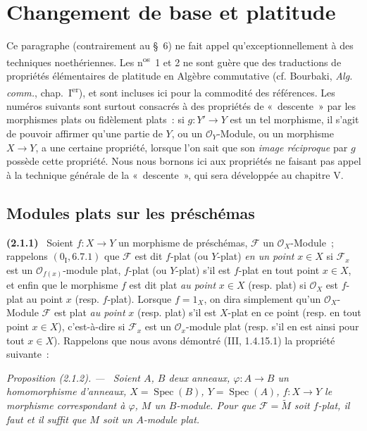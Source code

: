 \documentclass[10pt,oneside]{book}
\makeatletter
\newenvironment{env}[1][]{\par\medskip\noindent\textbf{(#1)}\ }{\par}
\newenvironment{proposition}[1][]{%
  \par\medskip\noindent\itshape Proposition (#1). ---\ }{\par}
\newcommand{\EGAReaderTarget}[2]{\hypertarget{#1}{}\@bsphack\begingroup\def\@currentHref{#1}\label{#2}\endgroup\@esphack}
\makeatother
\begin{document}
\setcounter{section}{1}
\section{Changement de base et platitude}
\label{section:IV.2-fr}

Ce paragraphe (contrairement au \S~6) ne fait appel qu'exceptionnellement à
des techniques noethériennes. Les n\textsuperscript{os}~1 et 2 ne sont guère
que des traductions de propriétés élémentaires de platitude en Algèbre
commutative (cf. Bourbaki, \emph{Alg. comm.}, chap.~I\textsuperscript{er}), et
sont incluses ici pour la commodité des références. Les numéros suivants sont
surtout consacrés à des propriétés de «~descente~» par les morphismes plats ou
fidèlement plats~: si $g:Y'\to Y$ est un tel morphisme, il s'agit de pouvoir
affirmer qu'une partie de $Y$, ou un $\mathcal O_Y$-Module, ou un morphisme
$X\to Y$, a une certaine propriété, lorsque l'on sait que son \emph{image
réciproque} par $g$ possède cette propriété. Nous nous bornons ici aux
propriétés ne faisant pas appel à la technique générale de la «~descente~»,
qui sera développée au chapitre V.

\setcounter{subsection}{0}
\subsection{Modules plats sur les préschémas}
\label{subsection:IV.2.1-fr}

\begin{env}[2.1.1]
\EGAReaderTarget{ega4.c04.statement.2-1-1}{IV.2.1.1-fr}
Soient $f:X\to Y$ un morphisme de préschémas, $\mathscr F$ un
$\mathcal O_X$-Module~; rappelons $(0_{\mathrm I},6.7.1)$ que $\mathscr F$ est
dit $f$-plat (ou $Y$-plat) \emph{en un point} $x\in X$ si $\mathscr F_x$ est
un $\mathcal O_{f(x)}$-module plat, $f$-plat (ou $Y$-plat) s'il est $f$-plat
en tout point $x\in X$, et enfin que le morphisme $f$ est dit plat \emph{au
point} $x\in X$ (resp. plat) si $\mathcal O_X$ est $f$-plat au point $x$
(resp. $f$-plat). Lorsque $f=1_X$, on dira simplement qu'un
$\mathcal O_X$-Module $\mathscr F$ est plat \emph{au point} $x$ (resp. plat)
s'il est $X$-plat en ce point (resp. en tout point $x\in X$), c'est-à-dire si
$\mathscr F_x$ est un $\mathcal O_x$-module plat (resp. s'il en est ainsi pour
tout $x\in X$). Rappelons que nous avons démontré (III, 1.4.15.1) la propriété
suivante~:
\end{env}

\begin{proposition}[2.1.2]
\label{IV.2.1.2-fr}
Soient $A$, $B$ deux anneaux, $\varphi:A\to B$ un homomorphisme d'anneaux,
$X=\operatorname{Spec}(B)$, $Y=\operatorname{Spec}(A)$, $f:X\to Y$ le
morphisme correspondant à $\varphi$, $M$ un $B$-module. Pour que
$\mathscr F=\widetilde M$ soit $f$-plat, il faut et il suffit que $M$ soit un
$A$-module plat.
\end{proposition}
\end{document}

